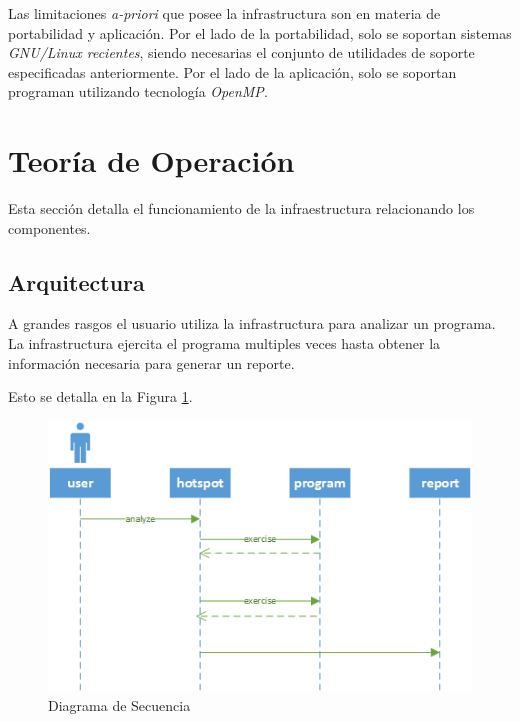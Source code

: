 \documentclass[a4paper]{report}
\begin{document}
\bigskip

Las limitaciones {\it a-priori} que posee la infrastructura son en materia de portabilidad y aplicación. Por el lado de la portabilidad, solo se soportan sistemas {\it GNU/Linux recientes}, siendo necesarias el conjunto de utilidades de soporte especificadas anteriormente. Por el lado de la aplicación, solo se soportan programan utilizando tecnología {\it OpenMP}.

\section{Teoría de Operación}

Esta sección detalla el funcionamiento de la infraestructura relacionando los componentes.

\subsection{Arquitectura}

A grandes rasgos el usuario utiliza la infrastructura para analizar un programa.
La infrastructura ejercita el programa multiples veces hasta obtener la información necesaria para generar un reporte.

\bigskip

Esto se detalla en la Figura \ref{fig:hotspot-seq}.

\begin{figure}[H]
\begin{center}
\includegraphics[width=\textwidth]{hotspot-seq.png}
\caption{Diagrama de Secuencia}
\label{fig:hotspot-seq}
\end{center}
\end{figure}
\end{document}
